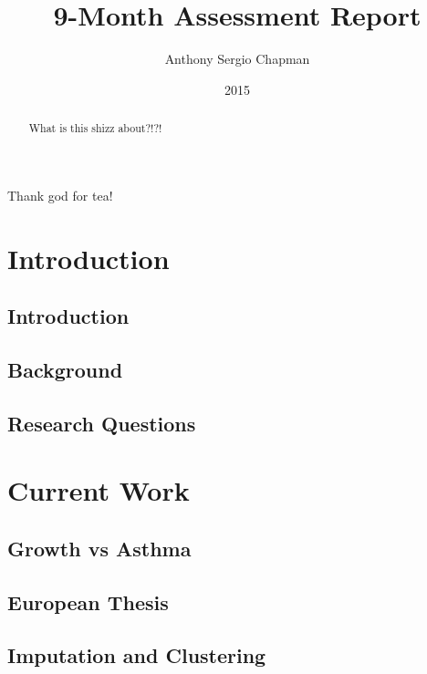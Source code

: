 \documentclass[bsc]{abdnthesis}
\author{Anthony Sergio Chapman}
\title{9-Month Assessment Report}
\date{2015}
\begin{document}
\maketitle
\makedeclaration


\begin{abstract}
  What is this shizz about?!?!
\end{abstract}

\begin{acknowledgements}
  Thank god for tea!
\end{acknowledgements}


\chapter{Introduction}
\section{Introduction} %
\label{sec:introduction}

\section{Background} %
\label{sec:background}

\section{Research Questions} %
\label{sec:research_questions}



\chapter{Current Work}
\section{Growth vs Asthma} %
\label{sec:growth_vs_asthma}

\section{European Thesis} %
\label{sec:european_thesis}

\section{Imputation and Clustering} %
\label{sec:imputation_and_clustering}
\end{document}

